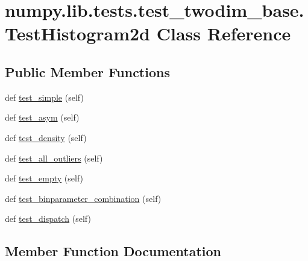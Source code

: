 \hypertarget{classnumpy_1_1lib_1_1tests_1_1test__twodim__base_1_1TestHistogram2d}{}\section{numpy.\+lib.\+tests.\+test\+\_\+twodim\+\_\+base.\+Test\+Histogram2d Class Reference}
\label{classnumpy_1_1lib_1_1tests_1_1test__twodim__base_1_1TestHistogram2d}
\subsection*{Public Member Functions}
\begin{DoxyCompactItemize}
\item 
def \hyperlink{classnumpy_1_1lib_1_1tests_1_1test__twodim__base_1_1TestHistogram2d_a2cc623fbf51fadc60a3747be52508ea9}{test\+\_\+simple} (self)
\item 
def \hyperlink{classnumpy_1_1lib_1_1tests_1_1test__twodim__base_1_1TestHistogram2d_a49caa99d55d701343263891bb36ee293}{test\+\_\+asym} (self)
\item 
def \hyperlink{classnumpy_1_1lib_1_1tests_1_1test__twodim__base_1_1TestHistogram2d_abe8a58c859b08d44e4fb334bc510c844}{test\+\_\+density} (self)
\item 
def \hyperlink{classnumpy_1_1lib_1_1tests_1_1test__twodim__base_1_1TestHistogram2d_a3853161bf3ac49c0ea2089eac0975992}{test\+\_\+all\+\_\+outliers} (self)
\item 
def \hyperlink{classnumpy_1_1lib_1_1tests_1_1test__twodim__base_1_1TestHistogram2d_aff220a8ba37f645938b9c35dd55c87fd}{test\+\_\+empty} (self)
\item 
def \hyperlink{classnumpy_1_1lib_1_1tests_1_1test__twodim__base_1_1TestHistogram2d_a73da723c98d5af9e1dd6918da284da28}{test\+\_\+binparameter\+\_\+combination} (self)
\item 
def \hyperlink{classnumpy_1_1lib_1_1tests_1_1test__twodim__base_1_1TestHistogram2d_a897979b85159a97a68ab065fa827ce42}{test\+\_\+dispatch} (self)
\end{DoxyCompactItemize}


\subsection{Member Function Documentation}
\mbox{\label{classnumpy_1_1lib_1_1tests_1_1test__twodim__base_1_1TestHistogram2d_a3853161bf3ac49c0ea2089eac0975992}} 
